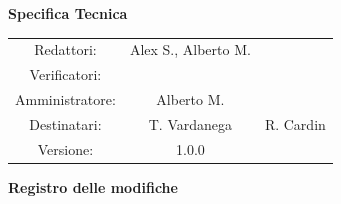 \documentclass[a4paper, 11pt]{article}
\begin{document}
\begin{center}
    \begin{Huge}
        \textbf{Specifica Tecnica} \\
        \vspace{4mm}

    \end{Huge}

    \vspace{20mm}

    \begin{large}
        \begin{spacing}{1.4}
            \begin{tabular}{c c c}
                Redattori:      & Alex S., Alberto M. &           \\
                Verificatori:   &                     &           \\
                Amministratore: & Alberto M.          &           \\
                Destinatari:    & T. Vardanega        & R. Cardin \\
                Versione:       & 1.0.0               &
            \end{tabular}
        \end{spacing}
    \end{large}
\end{center}

\pagebreak

\begin{huge}
    \textbf{Registro delle modifiche}
\end{huge}
\vspace{5pt}



\pagebreak
\tableofcontents
\pagebreak








\end{document}
